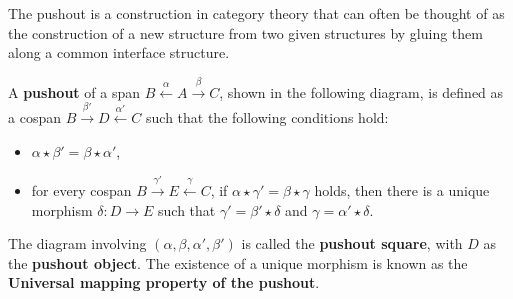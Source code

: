 The pushout is a construction in category theory that can often be thought of as the construction of a new structure from two given structures by gluing them along a common interface structure.
\begin{definition}
    \label{def:cat:po} 
    A \textbf{pushout} of a span \( B \overset{\alpha}{\leftarrow} A \overset{\beta}{\rightarrow} C \), shown in the following diagram,
    is defined as a cospan \( B \overset{\beta'}{\rightarrow} D \overset{\alpha'}{\leftarrow} C \) such that the following conditions hold:
    \begin{itemize}
        \item \( \alpha \mathop{\star} \beta' \mathop{=} \beta \mathop{\star} \alpha' \),
        \item for every cospan \( B \overset{\gamma'}{\rightarrow} E \overset{\gamma}{\leftarrow} C \), if \( \alpha \mathop{\star} \gamma' \mathop{=} \beta \mathop{\star} \gamma \) holds, then there is a unique morphism \(\delta : D  \mathop{\to} E\) such that \( \gamma' \mathop{=} \beta' \mathop{\star} \delta \) and \( \gamma \mathop{=} \alpha' \mathop{\star} \delta \).
    \end{itemize} 
    \begin{center}
            \end{center}
The diagram involving \( (\alpha, \beta, \alpha', \beta') \) is called the \textbf{pushout square}, with \(D\) as the \textbf{pushout object}. The existence of a unique morphism is known as the \textbf{Universal mapping property of the pushout}.
\end{definition} 

